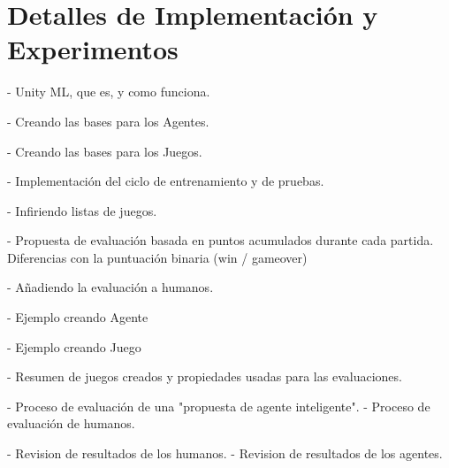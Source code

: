 \chapter{Detalles de Implementación y Experimentos}\label{chapter:implementation}


- Unity ML, que es, y como funciona.

- Creando las bases para los Agentes.

- Creando las bases para los Juegos.


- Implementación del ciclo de entrenamiento y de pruebas.

- Infiriendo listas de juegos.

- Propuesta de evaluación basada en puntos acumulados durante cada partida. Diferencias con la puntuación binaria (win / gameover)

- Añadiendo la evaluación a humanos.

- Ejemplo creando Agente 

- Ejemplo creando Juego

- Resumen de juegos creados y propiedades usadas para las evaluaciones.

- Proceso de evaluación de una "propuesta de agente inteligente".
- Proceso de evaluación de humanos.
 
- Revision de resultados de los humanos.
- Revision de resultados de los agentes.

